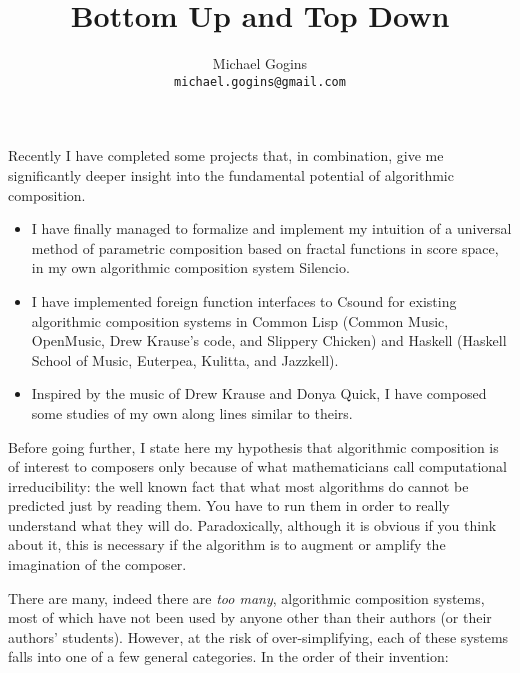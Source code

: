 \documentclass[english,11pt,letterpaper,onecolumn]{scrartcl}
\numberwithin{equation}{section}
\begin{document}
\title{Bottom Up and Top Down} \author{Michael
Gogins \\ \texttt{michael.gogins@gmail.com}} \maketitle

Recently I have completed some projects that, in combination, give me significantly deeper insight into the fundamental potential of algorithmic composition. 

\begin{itemize}
	\item I have finally managed to formalize and implement my intuition of a universal method of parametric composition based on fractal functions in score space, in my own algorithmic composition system Silencio. 
	
	\item I have implemented foreign function interfaces to Csound for existing algorithmic composition systems in Common Lisp (Common Music, OpenMusic, Drew Krause's code, and Slippery Chicken) and Haskell (Haskell School of Music, Euterpea, Kulitta, and Jazzkell). 
	
	\item Inspired by the music of Drew Krause and Donya Quick, I have composed some studies of my own along lines similar to theirs.
\end{itemize}

Before going further, I state here my hypothesis that algorithmic composition is of interest to composers only because of what mathematicians call computational irreducibility: the well known fact that what most algorithms do cannot be predicted just by reading them. You have to run them in order to really understand what they will do. Paradoxically, although it is obvious if you think about it, this is necessary if the algorithm is to augment or amplify the imagination of the composer.

There are many, indeed there are \textit{too many}, algorithmic composition systems, most of which have not been used by anyone other than their authors (or their authors' students). However, at the risk of over-simplifying, each of these systems falls into one of a few general categories. In the order of their invention:
\end{document}
